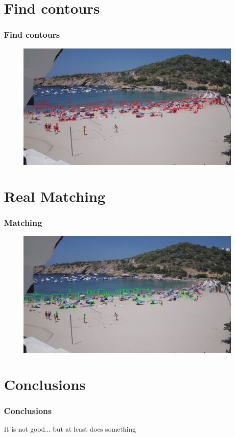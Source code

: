 \documentclass{beamer}
\begin{document}
\section*{Find contours}
\begin{frame}
    \frametitle{Find contours}
    \begin{figure}
        \centering
        \includegraphics[width=\textwidth]{../gen/det/1660305600.jpg}
    \end{figure}
\end{frame}

\section*{Real Matching}
\begin{frame}
    \frametitle{Matching}
    \begin{figure}
        \centering
        \includegraphics[width=\textwidth]{../gen/match/1660305600.jpg}
    \end{figure}
\end{frame}


\section*{Conclusions}
\begin{frame}
    \frametitle{Conclusions}
    It is not good... but at least does something
\end{frame}
\end{document}

